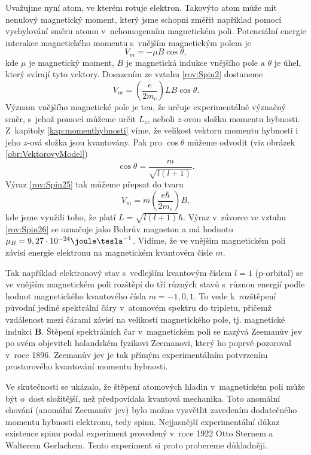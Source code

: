 Uvažujme nyní atom, ve kterém rotuje elektron. Takovýto atom může mít nenulový magnetický moment, který jsme schopni změřit například pomocí vychylování směru atomu v~nehomogenním magnetickém poli. Potenciální energie interakce magnetického momentu s~vnějším magnetickým polem je
\begin{equation}
V_m = - \mu B \cos \theta,
\nonumber
\end{equation}
kde $\mu$ je magnetický moment, $B$ je magnetická indukce vnějšího pole a $\theta$ je úhel, který svírají tyto vektory. Dosazením ze vztahu \eqref{rov:Spin2} dostaneme
\begin{equation}
V_m = \left( \frac{e}{2m_e} \right) LB \cos \theta.
\label{rov:Spin25}
\end{equation}
Význam vnějšího magnetické pole je ten, že určuje experimentálně význačný směr, s~jehož pomocí můžeme určit $L_z$, neboli $z$-ovou složku momentu hybnosti. Z~kapitoly \ref{kap:momenthybnosti} víme, že velikost vektoru momentu hybnosti i jeho $z$-ová složka jsou kvantovány. Pak pro $\cos \theta$ můžeme odvodit (viz obrázek \ref{obr:VektorovyModel})
\begin{equation}
\cos \theta = \frac{m}{\sqrt{l(l+1)}}.
\nonumber
\end{equation}
Výraz \eqref{rov:Spin25} tak můžeme přepsat do tvaru
\begin{equation}
V_m = m \left(\frac{e \hbar}{2 m_e} \right) B,
\label{rov:Spin26}
\end{equation}
kde jsme využili toho, že platí $L = \sqrt{l(l+1)}\hbar$. Výraz v~závorce ve vztahu \eqref{rov:Spin26} se označuje jako Bohrův magneton a má hodnotu $\mu_B = 9,27 \cdot 10^{-24} \joule \tesla^{-1}$. Vidíme, že ve vnějším magnetickém poli závisí energie elektronu na magnetickém kvantovém čísle $m$.

Tak například elektronový stav s~vedlejším kvantovým číslem $l = 1$ (p-orbital) se ve vnějším magnetickém poli rozštěpí do tří různých stavů s~různou energií podle hodnot magnetického kvantového čísla $m = -1, 0, 1$. To vede k~rozštěpení původní jediné spektrální čáry v~atomovém spektru do tripletu, přičemž vzdálenost mezi čárami závisí na velikosti magnetického pole, tj. magnetické indukci $\mathbf{B}$. Štěpení spektrálních čar v~magnetickém poli se nazývá Zeemanův jev po svém objeviteli holandském fyzikovi Zeemanovi, který ho poprvé pozoroval v~roce 1896. Zeemanův jev je tak přímým experimentálním potvrzením prostorového kvantování momentu hybnosti.

Ve skutečnosti se ukázalo, že štěpení atomových hladin v~magnetickém poli může být o~dost složitější, než předpovídala kvantová mechanika. Toto  anomální chování (anomální Zeemanův jev) bylo možno vysvětlit zavedením dodatečného momentu hybnosti elektronu, tedy spinu. Nejjasnější experimentální důkaz existence spinu podal experiment provedený v~roce 1922 Otto Sternem a Walterem Gerlachem. Tento experiment si proto probereme důkladněji.    


